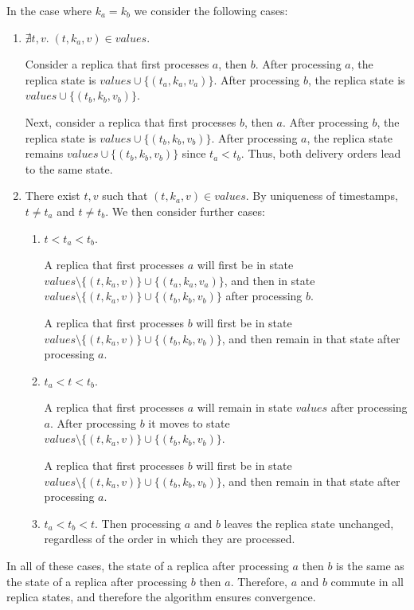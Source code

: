 {    In the case where $k_a=k_b$ we consider the following cases:
    \begin{enumerate}
        \item $\nexists t,v.\; (t,k_a,v) \in \mathit{values}.$

            Consider a replica that first processes $a$, then $b$.
            After processing $a$, the replica state is $\mathit{values} \cup \{(t_a,k_a,v_a)\}$.
            After processing $b$, the replica state is $\mathit{values} \cup \{(t_b,k_b,v_b)\}$.

            Next, consider a replica that first processes $b$, then $a$.
            After processing $b$, the replica state is $\mathit{values} \cup \{(t_b,k_b,v_b)\}$.
            After processing $a$, the replica state remains $\mathit{values} \cup \{(t_b,k_b,v_b)\}$ since $t_a < t_b$.
            Thus, both delivery orders lead to the same state.

        \item There exist $t,v$ such that $(t,k_a,v) \in \mathit{values}$.
            By uniqueness of timestamps, $t \ne t_a$ and $t \ne t_b$.
            We then consider further cases:

            \begin{enumerate}
                \item $t < t_a < t_b$.

                    A replica that first processes $a$ will first be in state $\mathit{values} \setminus \{(t,k_a,v)\} \cup \{(t_a,k_a,v_a)\}$, and then in state $\mathit{values} \setminus \{(t,k_a,v)\} \cup \{(t_b,k_b,v_b)\}$ after processing $b$.

                    A replica that first processes $b$ will first be in state $\mathit{values} \setminus \{(t,k_a,v)\} \cup \{(t_b,k_b,v_b)\}$, and then remain in that state after processing $a$.
                \item $t_a < t < t_b$.

                    A replica that first processes $a$ will remain in state $\mathit{values}$ after processing $a$.
                    After processing $b$ it moves to state $\mathit{values} \setminus \{(t,k_a,v)\} \cup \{(t_b,k_b,v_b)\}$.

                    A replica that first processes $b$ will first be in state $\mathit{values} \setminus \{(t,k_a,v)\} \cup \{(t_b,k_b,v_b)\}$, and then remain in that state after processing $a$.
                \item $t_a < t_b < t$.
                    Then processing $a$ and $b$ leaves the replica state unchanged, regardless of the order in which they are processed.
            \end{enumerate}
    \end{enumerate}
    In all of these cases, the state of a replica after processing $a$ then $b$ is the same as the state of a replica after processing $b$ then $a$.
    Therefore, $a$ and $b$ commute in all replica states, and therefore the algorithm ensures convergence.
}

